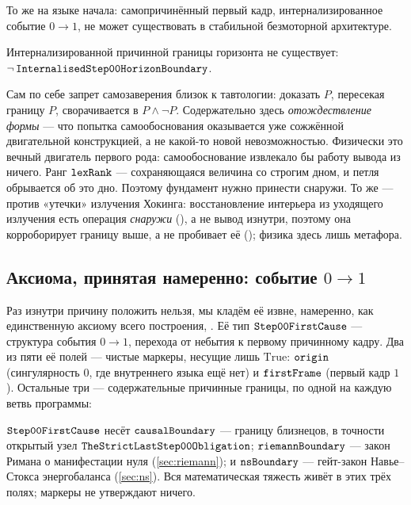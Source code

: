 То же на языке начала: самопричинённый первый кадр, интернализированное событие $0 \to 1$, не может
существовать в стабильной безмоторной архитектуре.

\begin{theorem}\label{thm:no_internalisedHorizonBoundary}
\green{} Интернализированной причинной границы горизонта не существует:
$\lnot\,\texttt{InternalisedStep00HorizonBoundary}$.
\end{theorem}

\begin{remark}
Сам по себе запрет самозаверения близок к тавтологии: доказать $P$, пересекая границу $P$,
сворачивается в $P \wedge \lnot P$. Содержательно здесь \emph{отождествление формы} --- что попытка
самообоснования оказывается уже сожжённой двигательной конструкцией, а не какой-то новой
невозможностью. Физически это вечный двигатель первого рода: самообоснование извлекало бы работу
вывода из ничего. Ранг $\texttt{lexRank}$ --- сохраняющаяся величина со строгим дном, и петля обрывается
об это дно. Поэтому фундамент нужно принести снаружи. То же --- против «утечки» излучения Хокинга:
восстановление интерьера из уходящего излучения есть операция \emph{снаружи} (),
а не вывод изнутри, поэтому она корроборирует границу выше, а не пробивает её
(); физика здесь лишь метафора.
\end{remark}

\subsection{Аксиома, принятая намеренно: событие \texorpdfstring{$0\to1$}{0->1}}

Раз изнутри причину положить нельзя, мы кладём её извне, намеренно, как единственную аксиому всего
построения, \axiom{}. Её тип $\texttt{Step00FirstCause}$ --- структура события $0 \to 1$, перехода от
небытия к первому причинному кадру. Два из пяти её полей --- чистые маркеры, несущие лишь
$\mathrm{True}$: $\texttt{origin}$ (сингулярность $0$, где внутреннего языка ещё нет) и
$\texttt{firstFrame}$ (первый кадр $1$). Остальные три --- содержательные причинные границы, по одной на
каждую ветвь программы:

\begin{definition}\label{def:step00FirstCause}
$\texttt{Step00FirstCause}$ несёт $\texttt{causalBoundary}$ --- границу близнецов, в точности открытый
узел $\texttt{TheStrictLastStep00Obligation}$; $\texttt{riemannBoundary}$ --- закон Римана о манифестации
нуля (\cref{sec:riemann}); и $\texttt{nsBoundary}$ --- гейт-закон Навье--Стокса энергобаланса
(\cref{sec:ns}). Вся математическая тяжесть живёт в этих трёх полях; маркеры не утверждают ничего.
\end{definition}

